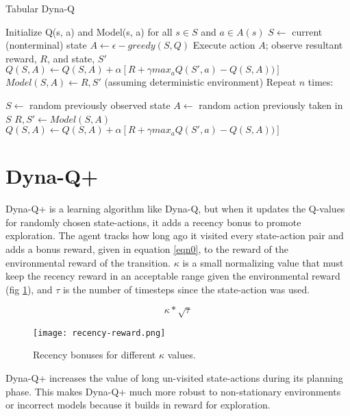 \documentclass{article}
\newlength\myindent
\newcommand\bindent{%
  \begingroup
  \setlength{\itemindent}{\myindent}
  \addtolength{\algorithmicindent}{\myindent}
}
\newcommand\eindent{\endgroup}
\begin{document}
\begin{algorithm}
    \caption{Tabular Dyna-Q}\label{alg:alg0}
    \begin{algorithmic}
      \STATE Initialize Q(s, a) and Model(s, a) for all $s \in S$ and $a \in A(s)$
        \STATE $S \leftarrow$ current (nonterminal) state
        \STATE $A \leftarrow \epsilon-greedy(S,Q)$
        \STATE Execute action $A$; observe resultant reward, $R$, and state, $S'$
        \STATE $Q(S,A) \leftarrow Q(S,A) + \alpha[R + \gamma max_a Q(S',a) - Q(S,A))]$
        \STATE $Model(S,A) \leftarrow R,S'$ (assuming deterministic environment)
        \STATE Repeat $n$ times:
        \bindent
          \STATE $S \leftarrow$ random previously observed state
          \STATE $A \leftarrow$ random action previously taken in $S$
          \STATE $R,S' \leftarrow Model(S,A)$
          \STATE $Q(S,A) \leftarrow Q(S,A) + \alpha[R + \gamma max_a Q(S',a) - Q(S,A))]$
        \eindent
      \ENDWHILE
    \end{algorithmic}
  \end{algorithm}


\section{Dyna-Q+}

Dyna-Q+ is a learning algorithm like Dyna-Q, but when it updates the Q-values for randomly chosen state-actions, it adds a recency bonus to promote exploration. The agent tracks how long ago it visited every state-action pair and adds a bonus reward, given in equation \ref{eqn0}, to the reward of the environmental reward of the transition. $\kappa$ is a small normalizing value that must keep the recency reward in an acceptable range given the environmental reward (fig \ref{fig:fig0}), and $\tau$ is the number of timesteps since the state-action was used. 

\begin{equation}\label{eqn0}
    \kappa * \sqrt{\tau}
\end{equation}

\begin{figure}[H]
    \centering
    \texttt{[image: recency-reward.png]}
    \caption{Recency bonuses for different $\kappa$ values.}
    \label{fig:fig0}
\end{figure}

Dyna-Q+ increases the value of long un-visited state-actions during its planning phase. This makes Dyna-Q+ much more robust to non-stationary environments or incorrect models because it builds in reward for exploration. 
\end{document}
